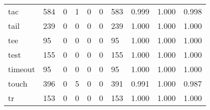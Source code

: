 \begin{longtable}{lp{2.0cm}p{2.0cm}p{2.0cm}p{2.0cm}p{2.0cm}p{2.0cm}p{2.0cm}p{2.0cm}p{2.0cm}}
tac       &                    584 &                                             0 &                                            1 &                                           0 &                                            0 &                                        583 &                                0.999 &                                  1.000 &                                0.998 \\
tail      &                    239 &                                             0 &                                            0 &                                           0 &                                            0 &                                        239 &                                1.000 &                                  1.000 &                                1.000 \\
tee       &                     95 &                                             0 &                                            0 &                                           0 &                                            0 &                                         95 &                                1.000 &                                  1.000 &                                1.000 \\
test      &                    155 &                                             0 &                                            0 &                                           0 &                                            0 &                                        155 &                                1.000 &                                  1.000 &                                1.000 \\
timeout   &                     95 &                                             0 &                                            0 &                                           0 &                                            0 &                                         95 &                                1.000 &                                  1.000 &                                1.000 \\
touch     &                    396 &                                             0 &                                            5 &                                           0 &                                            0 &                                        391 &                                0.991 &                                  1.000 &                                0.987 \\
tr        &                    153 &                                             0 &                                            0 &                                           0 &                                            0 &                                        153 &                                1.000 &                                  1.000 &                                1.000 \\

\end{longtable}
